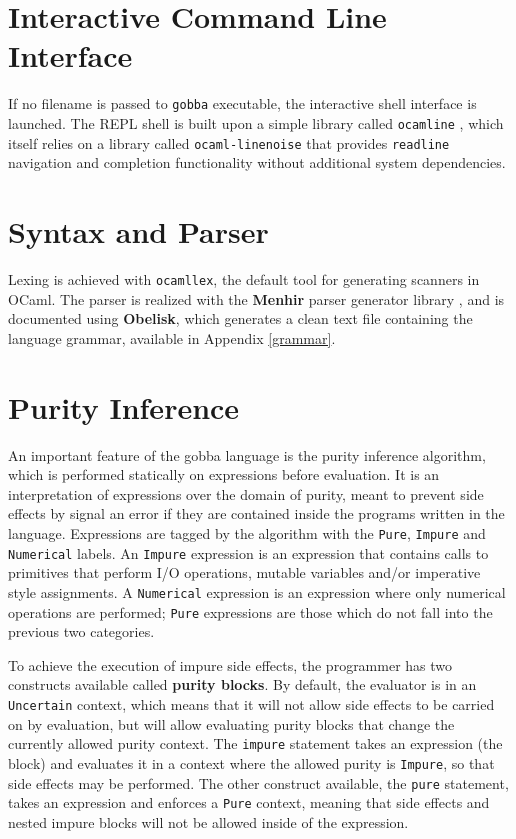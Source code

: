 \documentclass[a4paper, 10pt]{article}
\theoremstyle{plain}%
\theoremstyle{definition}
\theoremstyle{remark}
\begin{document}
\clearpage

\begin{multicols}{2}

\section{Interactive Command Line Interface}
If no filename is passed to \texttt{gobba} executable, the interactive shell
interface is launched. The REPL shell is built upon a simple library called
\texttt{ocamline} \cite{ocamline}, which itself relies on a library called
\texttt{ocaml-linenoise} \cite{linenoise} that provides \texttt{readline}
navigation and completion functionality without additional system
dependencies.

\section{Syntax and Parser}
Lexing is achieved with \texttt{ocamllex}, the default tool for generating
scanners in OCaml. The parser is realized with the \textbf{Menhir} parser
generator library \cite{menhir}, and is documented using \textbf{Obelisk}, which
generates a clean text file containing the language grammar, available in
Appendix \ref{grammar}.

\section{Purity Inference}
An important feature of the gobba language is the purity inference algorithm,
which is performed statically on expressions before evaluation. It is an interpretation of expressions over the domain of purity, meant to
prevent side effects by signal an error if they are contained inside the
programs written in the language. Expressions are tagged by the algorithm with
the \texttt{Pure}, \texttt{Impure} and \texttt{Numerical} labels. An
\texttt{Impure} expression is an expression that contains calls to primitives
that perform I/O operations, mutable variables and/or imperative style
assignments. A \texttt{Numerical} expression is an expression where only
numerical operations are performed; \texttt{Pure} expressions are those which do not fall into the previous two
categories.

To achieve the execution of impure side effects, the programmer has two constructs
available called \textbf{purity blocks}. By default, the evaluator is in an
\texttt{Uncertain} context, which means that it will not allow side effects to
be carried on by evaluation, but will allow evaluating purity blocks that change
the currently allowed purity context. The \texttt{impure} statement takes an
expression (the block) and evaluates it in a context where the allowed purity is
\texttt{Impure}, so that side effects may be performed. The other construct
available, the \texttt{pure} statement, takes an expression and enforces a
\texttt{Pure} context, meaning that side effects and nested impure blocks will
not be allowed inside of the expression.


\end{multicols}
\end{document}
